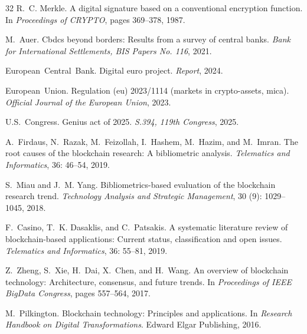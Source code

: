 \documentclass[11pt]{article}
\begin{document}
\begin{thebibliography}{32}
R.~C. Merkle.
\newblock A digital signature based on a conventional encryption function.
\newblock In \emph{Proceedings of CRYPTO}, pages 369--378, 1987.

M.~Auer.
\newblock Cbdcs beyond borders: Results from a survey of central banks.
\newblock \emph{Bank for International Settlements, BIS Papers No. 116}, 2021.

European~Central~Bank.
\newblock Digital euro project.
\newblock \emph{Report}, 2024.

European~Union.
\newblock Regulation (eu) 2023/1114 (markets in crypto-assets, mica).
\newblock \emph{Official Journal of the European Union}, 2023.

U.S.~Congress.
\newblock Genius act of 2025.
\newblock \emph{S.394, 119th Congress}, 2025.

A.~Firdaus, N.~Razak, M.~Feizollah, I.~Hashem, M.~Hazim, and M.~Imran.
\newblock The root causes of the blockchain research: A bibliometric analysis.
\newblock \emph{Telematics and Informatics}, 36: 46--54, 2019.

S.~Miau and J.~M. Yang.
\newblock Bibliometrics-based evaluation of the blockchain research trend.
\newblock \emph{Technology Analysis and Strategic Management}, 30
  (9): 1029--1045, 2018.

F.~Casino, T.~K. Dasaklis, and C.~Patsakis.
\newblock A systematic literature review of blockchain-based applications:
  Current status, classification and open issues.
\newblock \emph{Telematics and Informatics}, 36: 55--81, 2019.

Z.~Zheng, S.~Xie, H.~Dai, X.~Chen, and H.~Wang.
\newblock An overview of blockchain technology: Architecture, consensus, and
  future trends.
\newblock In \emph{Proceedings of IEEE BigData Congress}, pages 557--564, 2017.

M.~Pilkington.
\newblock Blockchain technology: Principles and applications.
\newblock In \emph{Research Handbook on Digital Transformations}. Edward Elgar
  Publishing, 2016.


\end{thebibliography}
\end{document}
